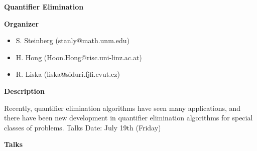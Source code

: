 \begin{center}
{\LARGE \bf Quantifier Elimination
}
\end{center}
\bigskip

{\bf Organizer}
\medskip

\begin{itemize}

\item
S. Steinberg (stanly@math.unm.edu)
\item
H. Hong (Hoon.Hong@risc.uni-linz.ac.at)

\item
R. Liska (liska@siduri.fjfi.cvut.cz)

\end{itemize}

\bigskip

{\bf Description}
\medskip

Recently, quantifier elimination algorithms have seen many applications, and there have been new
development in quantifier elimination algorithms for special classes of problems. Talks Date: July
19th (Friday) 

\bigskip
{\bf Talks}
\medskip


